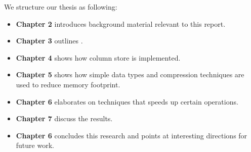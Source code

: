 We structure our thesis as following:
\begin{itemize}
  \item \textbf{Chapter 2} introduces background material relevant to this report. 
  \item \textbf{Chapter 3} outlines \gap.
  \item \textbf{Chapter 4} shows how column store is implemented.
  \item \textbf{Chapter 5} shows how simple data types and compression techniques are used to reduce memory footprint.
  \item \textbf{Chapter 6} elaborates on techniques that speeds up certain operations.
  \item \textbf{Chapter 7} discuss the results.
  \item \textbf{Chapter 6} concludes this research and points at interesting directions for future work.
\end{itemize}



